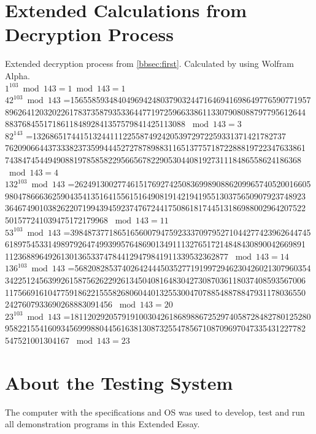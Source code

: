 \documentclass[a4paper, 12pt]{article}
\begin{document}
\section{Extended Calculations from Decryption Process}
\label{calc}
Extended decryption process from \ref{bbsec:first}. Calculated by using Wolfram Alpha.\cite{wa}\\

$1^{103} \bmod 143 =1 \bmod 143 = 1$\\

  $42 ^{103} \bmod 143$ =15655859348404969424803790324471646941698649776590771957
8962641203202261783735879353364477197259663386113307908088797795612644
883768455171861184892841357579841425113088 $\bmod 143 = 3$\\

$82 ^ {143}$ =13268651744151324411122558749242053972972259331371421782737
7620906644373338237359944452727878988311651377571872288819722347633861
743847454494908819785858229566567822905304408192731118486558624186368
$\bmod 143 = 4$\\

$132^ {103} \bmod 143$ =2624913002774615176927425083699890886209965740520016605
9804786663625904354135164155615164908191421941955130375650907923748923
3646749010382622071994394592374767244175086181744513186988002964207522
501577241039475172179968 $\bmod 143 = 11$\\

$53^ {103} \bmod 143$ =39848737718651656007947592333709795271044277423962644745
6189754533149897926474993995764869013491113276517214848430890042669891
1123688964926130136533747844129479841911339532362877 $\bmod 143 = 14$\\

$136 ^{103} \bmod 143$ =5682082853740264244450352771919972946230426021307960354
3422512456399261587562622926134504081648304273087036118037408593567006
1175669161047759186221555826806044013255300470788548878847931178036550
2427607933690268883091456 $\bmod 143 = 20$\\

$23 ^{103} \bmod 143$ =18112029205791910030426186898867252974058728482780125280
9582215541609345699988044561638130873255478567108709697047335431227782
547521001304167 $\bmod 143 = 23$\\


\newpage

\section{About the Testing System}
\label{specs}
The computer with the specifications and OS\cite{BunsenLabs}\cite{Debian} was used to develop, test and run all demonstration
programs\cite{github} in this Extended Essay.
\end{document}
